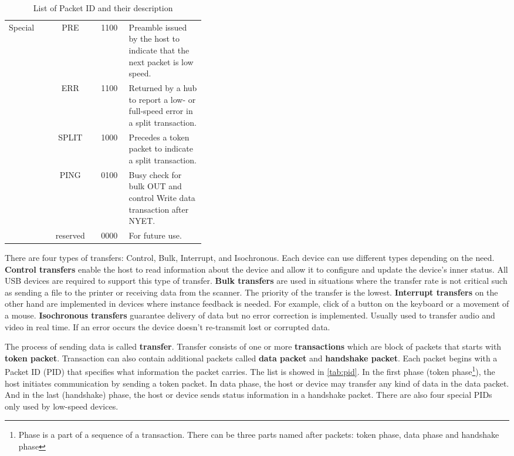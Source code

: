 \begin{table}[ht]
\begin{tabular}{|l|c|c|p{0.39\linewidth}|}
        \multirow{5}{3cm}{Special} & PRE & 1100 & Preamble issued by the host to indicate that the next packet is low speed. \\ \cline{2-4}
          & ERR & 1100 & Returned by a hub to report a low- or full-speed error in a split transaction. \\ \cline{2-4}
          & SPLIT & 1000 & Precedes a token packet to indicate a split transaction. \\ \cline{2-4}
          & PING & 0100 & Busy check for bulk OUT and control Write data transaction after NYET. \\ \cline{2-4}
          & reserved & 0000 & For future use. \\ \hline
    \end{tabular}
    \caption{List of Packet ID and their description}
    \label{tab:pid}
\end{table}

There are four types of transfers: Control, Bulk, Interrupt, and Isochronous. Each device can use different types depending on the need. \textbf{Control transfers} enable the host to read information about the device and allow it to configure and update the device's inner status. All USB devices are required to support this type of transfer. \textbf{Bulk transfers} are used in situations where the transfer rate is not critical such as sending a file to the printer or receiving data from the scanner. The priority of the transfer is the lowest. \textbf{Interrupt transfers} on the other hand are implemented in devices where instance feedback is needed. For example, click of a button on the keyboard or a movement of a mouse. \textbf{Isochronous transfers} guarantee delivery of data but no error correction is implemented. Usually used to transfer audio and video in real time. If an error occurs the device doesn't re-transmit lost or corrupted data.

The process of sending data is called \textbf{transfer}. Transfer consists of one or more \textbf{transactions} which are block of packets that starts with \textbf{token packet}. Transaction can also contain additional packets called \textbf{data packet} and \textbf{handshake packet}. Each packet begins with a Packet ID (PID) that specifies what information the packet carries. The list is showed in \autoref{tab:pid}. In the first phase (token phase\footnote{Phase is a part of a sequence of a transaction. There can be three parts named after packets: token phase, data phase and handshake phase}), the host initiates communication by sending a token packet. In data phase, the host or device may transfer any kind of data in the data packet. And in the last (handshake) phase, the host or device sends status information in a handshake packet. There are also four special PIDs only used by low-speed devices. 
    
